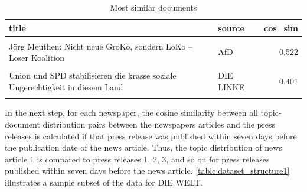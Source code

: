 \documentclass[
]{article}
\begin{document}
\begin{table}[H]

\caption{\label{tab:Documents with highest similarity}Most similar documents \label{table:cosine_sim_sample_doc}}
\centering
\fontsize{7}{9}\selectfont
\begin{tabular}[t]{llr}
\toprule
title & source & cos\_sim\\
\midrule
\cellcolor{gray!6}{Asylzahlen 2017 - schwarz-rot führt Obergrenze durch die Hintertür ein} & \cellcolor{gray!6}{DIE LINKE} & \cellcolor{gray!6}{0.542}\\
Jörg Meuthen: Nicht neue GroKo, sondern LoKo – Loser Koalition & AfD & 0.522\\
\cellcolor{gray!6}{Rentenpläne von Union und SPD schlimmer als erwartet} & \cellcolor{gray!6}{FDP} & \cellcolor{gray!6}{0.478}\\
Union und SPD stabilisieren die krasse soziale Ungerechtigkeit in diesem Land & DIE LINKE & 0.401\\
\cellcolor{gray!6}{Jürgen Pohl: Union und SPD verabreden Politik zu Lasten von Rentnern und Ostdeutschen} & \cellcolor{gray!6}{AfD} & \cellcolor{gray!6}{0.388}\\
\bottomrule
\end{tabular}
\end{table}

In the next step, for each newspaper, the cosine similarity between all
topic-document distribution pairs between the newspapers articles and
the press releases is calculated if that press release was published
within seven days before the publication date of the news article. Thus,
the topic distribution of news article 1 is compared to press releases
1, 2, 3, and so on for press releases published within seven days before
the news article. \autoref{table:dataset_structure1} illustrates a
sample subset of the data for DIE WELT.
\end{document}
